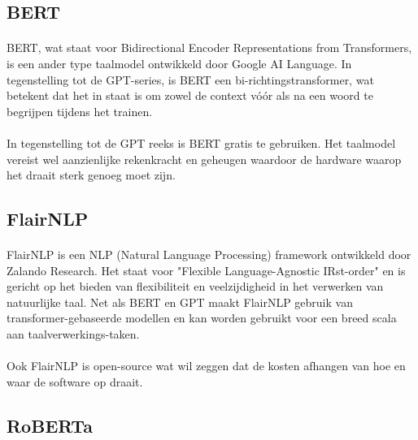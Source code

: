 \subsection{BERT}%

\paragraph{}
BERT, wat staat voor Bidirectional Encoder Representations from Transformers, is een ander type taalmodel ontwikkeld door Google AI Language. In tegenstelling tot de GPT-series, is BERT een bi-richtingstransformer, wat betekent dat het in staat is om zowel de context vóór als na een woord te begrijpen tijdens het trainen.

\paragraph{}
In tegenstelling tot de GPT reeks is BERT gratis te gebruiken. Het taalmodel vereist wel aanzienlijke rekenkracht en geheugen waardoor de hardware waarop het draait sterk genoeg moet zijn.

\subsection{FlairNLP}%

\paragraph{}
FlairNLP is een NLP (Natural Language Processing) framework ontwikkeld door Zalando Research. Het staat voor "Flexible Language-Agnostic IRst-order" en is gericht op het bieden van flexibiliteit en veelzijdigheid in het verwerken van natuurlijke taal. Net als BERT en GPT maakt FlairNLP gebruik van transformer-gebaseerde modellen en kan worden gebruikt voor een breed scala aan taalverwerkings-taken.

\paragraph{}
Ook FlairNLP is open-source wat wil zeggen dat de kosten afhangen van hoe en waar de software op draait.

\subsection{RoBERTa}%


